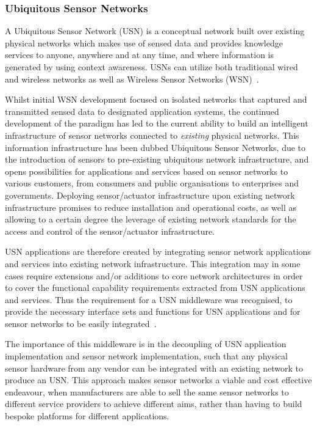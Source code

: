 \subsubsection{Ubiquitous Sensor Networks}
A Ubiquitous Sensor Network (USN) is a conceptual network built over existing physical networks which makes use of sensed data and provides knowledge services to anyone, anywhere and at any time, and where information is generated by using context awareness. USNs can utilize both traditional wired and wireless networks as well as Wireless Sensor Networks (WSN)~\cite{ITU2010}.

Whilst initial WSN development focused on isolated networks that captured and transmitted sensed data to designated application systems, the continued development of the paradigm has led to the current ability to build an intelligent infrastructure of sensor networks connected to \textit{existing} physical networks. This information infrastructure has been dubbed Ubiquitous Sensor Networks, due to the introduction of sensors to pre-existing ubiquitous network infrastructure, and opens possibilities for applications and services based on sensor networks to various customers, from consumers and public organisations to enterprises and governments. Deploying sensor/actuator infrastructure upon existing network infrastructure promises to reduce installation and operational costs, as well as allowing to a certain degree the leverage of existing network standards for the access and control of the sensor/actuator infrastructure.

USN applications are therefore created by integrating sensor network applications and services into existing network infrastructure. This integration may in some cases require extensions and/or additions to core network architectures in order to cover the functional capability requirements extracted from USN applications and services. Thus the requirement for a USN middleware was recognised, to provide the necessary interface sets and functions for USN applications and for sensor networks to be easily integrated~\cite{kim:practical}.

The importance of this middleware is in the decoupling of USN application implementation and sensor network implementation, such that any physical sensor hardware from any vendor can be integrated with an existing network to produce an USN. This approach makes sensor networks a viable and cost effective endeavour, when manufacturers are able to sell the same sensor networks to different service providers to achieve different aims, rather than having to build bespoke platforms for different applications.

